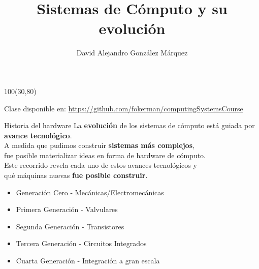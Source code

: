 \documentclass[aspectratio=169]{beamer}
\title{\Huge Sistemas de Cómputo y su evolución}
\author{David Alejandro González Márquez}
\date{}
\begin{document}
\begin{frame}[plain]
    \titlepage
    \begin{textblock}{100}(30,80)
    \begin{tcolorbox}[size=small,width=\textwidth,colback={gray!30},title={}]
    \begin{center}
     \scriptsize Clase disponible en: \url{https://github.com/fokerman/computingSystemsCourse}
    \end{center}
    \end{tcolorbox}
    \end{textblock}
\end{frame}


\begin{frame}[fragile,t]{Historia del hardware}
    La \textbf{evolución} de los sistemas de cómputo está guiada por \textbf{avance tecnológico}.\\
    \bigskip
    A medida que pudimos construir \textbf{sistemas más complejos},\\ fue posible materializar ideas en forma de hardware de cómputo.\\
    \bigskip
    \pause 
    Este recorrido revela cada uno de estos avances tecnológicos y\\ qué máquinas nuevas \textbf{fue posible construir}.\\
    \bigskip
    \begin{itemize}
    \item {Generación Cero} - \textcolor{verdeuca}{Mecánicas/Electromecánicas}
    \item {Primera Generación} - \textcolor{verdeuca}{Valvulares}
    \item {Segunda Generación} - \textcolor{verdeuca}{Transistores}
    \item {Tercera Generación} - \textcolor{verdeuca}{Circuitos Integrados}
    \item {Cuarta Generación} - \textcolor{verdeuca}{Integración a gran escala}
    \end{itemize}
\end{frame}
\end{document}
